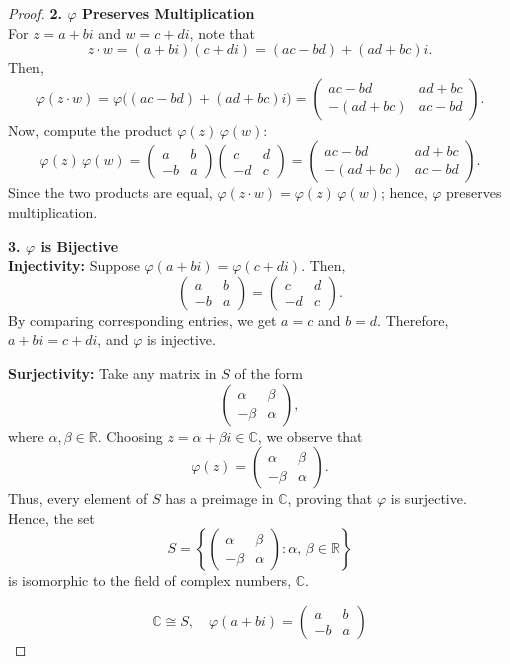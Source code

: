 \documentclass[letterpaper, 11pt]{article}
\newcommand{\1}{\mathds{1}}	%
\theoremstyle{definition}
\begin{document}
\begin{proof}
\textbf{2. $\varphi$ Preserves Multiplication}\\
For $z = a+bi$ and $w = c+di$, note that
\[
z\cdot w = (a+bi)(c+di) = (ac-bd) + (ad+bc)i.
\]
Then,
\[
\varphi(z\cdot w) = \varphi\bigl((ac-bd) + (ad+bc)i\bigr) = \begin{pmatrix} ac-bd & ad+bc \\ -(ad+bc) & ac-bd \end{pmatrix}.
\]
Now, compute the product $\varphi(z)\,\varphi(w)$:
\[
\varphi(z)\,\varphi(w) = \begin{pmatrix} a & b \\ -b & a \end{pmatrix}\begin{pmatrix} c & d \\ -d & c \end{pmatrix} 
= \begin{pmatrix} ac-bd & ad+bc \\ -(ad+bc) & ac-bd \end{pmatrix}.
\]
Since the two products are equal, $\varphi(z\cdot w) = \varphi(z)\,\varphi(w)$; hence, $\varphi$ preserves multiplication.

\textbf{3. $\varphi$ is Bijective}\\
\textbf{Injectivity:}  
Suppose $\varphi(a+bi)=\varphi(c+di)$. Then,
\[
\begin{pmatrix} a & b \\ -b & a \end{pmatrix} = \begin{pmatrix} c & d \\ -d & c \end{pmatrix}.
\]
By comparing corresponding entries, we get $a = c$ and $b = d$. Therefore, $a+bi = c+di$, and $\varphi$ is injective.

\textbf{Surjectivity:}  
Take any matrix in $S$ of the form
\[
\begin{pmatrix} \alpha & \beta \\ -\beta & \alpha \end{pmatrix},
\]
where $\alpha, \beta \in \mathbb{R}$. Choosing $z = \alpha + \beta i \in \mathbb{C}$, we observe that
\[
\varphi(z) = \begin{pmatrix} \alpha & \beta \\ -\beta & \alpha \end{pmatrix}.
\]
Thus, every element of $S$ has a preimage in $\mathbb{C}$, proving that $\varphi$ is surjective.
\\Hence, the set
\[
S = \left\{ \begin{pmatrix} \alpha & \beta \\ -\beta & \alpha \end{pmatrix} : \alpha,\, \beta \in \mathbb{R} \right\}
\]
is isomorphic to the field of complex numbers, $\mathbb{C}$.

\[
{\mathbb{C} \cong S,\quad \varphi(a+bi) = \begin{pmatrix} a & b \\ -b & a \end{pmatrix}}
\]

\end{proof}
\end{document}
